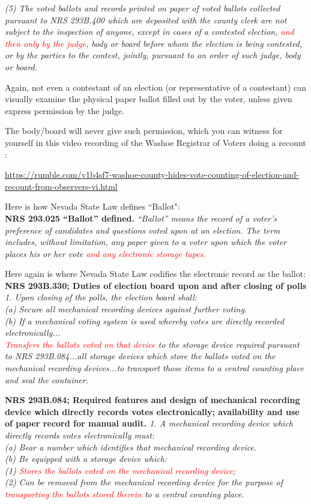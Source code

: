 \textit{(5) The voted ballots and records printed on paper of voted ballots collected pursuant to NRS 293B.400 which are deposited with the county clerk are not subject to the inspection of anyone, except in cases of a contested election, \textcolor{red}{and then only by the judge}, body or board before whom the election is being contested, or by the parties to the contest, jointly, pursuant to an order of such judge, body or board.}

Again, not even a contestant of an election (or representative of a contestant) can visually examine the physical paper ballot filled out by the voter, unless given express permission by the judge.

The body/board will never give such permission, which you can witness for yourself in this video recording of the Washoe Registrar of Voters doing a recount :

\url{https://rumble.com/v1b4sf7-washoe-county-hides-vote-counting-of-election-and-recount-from-observers-vi.html}

Here is how Nevada State Law defines ``Ballot":\\
\textbf{NRS 293.025 “Ballot” defined.}
\textit{“Ballot” means the record of a voter’s preference of candidates and questions voted upon at an election. The term includes, without limitation, any paper given to a voter upon which the voter places his or her vote \textcolor{red}{and any electronic storage tapes.}}

Here again is where Nevada State Law codifies the electronic record as the ballot:\\
\textbf{NRS 293B.330; Duties of election board upon and after closing of polls}\\
\textit{1. Upon closing of the polls, the election board shall:\\
(a) Secure all mechanical recording devices against further voting.\\
(b) If a mechanical voting system is used whereby votes are directly recorded electronically...}\\
\textit{\textcolor{red}{Transfers the ballots voted on that device} to the storage device required pursuant to NRS 293B.084...all storage devices which store the ballots voted on the mechanical recording devices...to transport those items to a central counting place and seal the container.}

\textbf{NRS 293B.084; Required features and design of mechanical recording device which directly records votes electronically; availability and use of paper record for manual audit.}
\textit{1. A mechanical recording device which directly records votes electronically must:\\
(a) Bear a number which identifies that mechanical recording device.\\
(b) Be equipped with a storage device which:\\
(1) \textcolor{red}{Stores the ballots voted on the mechanical recording device};\\
(2) Can be removed from the mechanical recording device for the purpose of \textcolor{red}{transporting the ballots stored therein} to a central counting place.}

